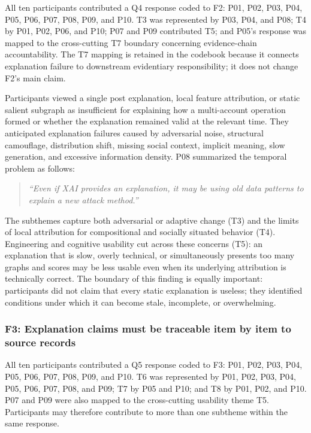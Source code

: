 All ten participants contributed a Q4 response coded to F2: P01, P02, P03,
P04, P05, P06, P07, P08, P09, and P10. T3 was represented by P03, P04, and
P08; T4 by P01, P02, P06, and P10; P07 and P09 contributed T5; and P05's
response was mapped to the cross-cutting T7 boundary concerning evidence-chain
accountability. The T7 mapping is retained in the codebook because it connects
explanation failure to downstream evidentiary responsibility; it does not
change F2's main claim.

Participants viewed a single post explanation, local feature attribution, or
static salient subgraph as insufficient for explaining how a multi-account
operation formed or whether the explanation remained valid at the relevant
time. They anticipated explanation failures caused by adversarial noise,
structural camouflage, distribution shift, missing social context, implicit
meaning, slow generation, and excessive information density. P08 summarized the
temporal problem as follows:

\begin{quote}
\emph{``Even if XAI provides an explanation, it may be using old data patterns to explain a new attack method.''}
\end{quote}

The subthemes capture both adversarial or adaptive change (T3) and the limits
of local attribution for compositional and socially situated behavior (T4).
Engineering and cognitive usability cut across these concerns (T5): an
explanation that is slow, overly technical, or simultaneously presents too
many graphs and scores may be less usable even when its underlying attribution
is technically correct. The boundary of this finding is equally important:
participants did not claim that every static explanation is useless; they
identified conditions under which it can become stale, incomplete, or
overwhelming.

\subsubsection{F3: Explanation claims must be traceable item by item to source records}
\label{sec:f3}

All ten participants contributed a Q5 response coded to F3: P01, P02, P03,
P04, P05, P06, P07, P08, P09, and P10. T6 was represented by P01, P02, P03,
P04, P05, P06, P07, P08, and P09; T7 by P05 and P10; and T8 by P01, P02,
and P10. P07 and P09 were also mapped to the cross-cutting usability theme
T5. Participants may therefore contribute to more than one subtheme within
the same response.

